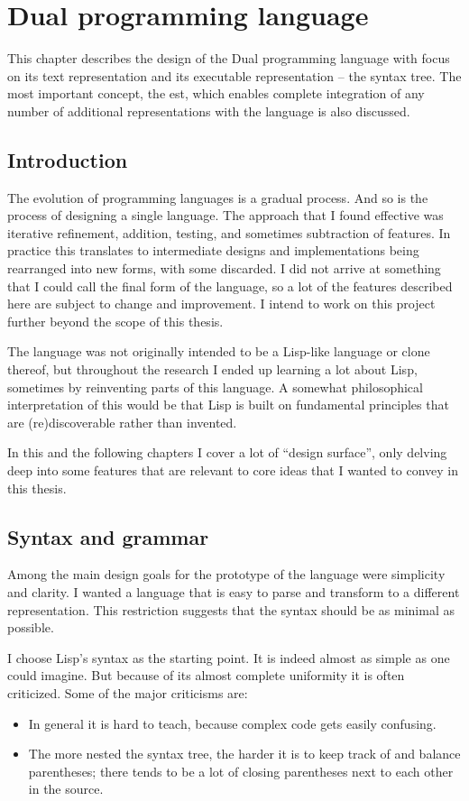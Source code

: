 \chapter{Dual programming language}\label{chap:lang}
This chapter describes the design of the Dual programming language with focus on its text representation and its executable representation -- the syntax tree. The most important concept, the \acrlong{est}, which enables complete integration of any number of additional representations with the language is also discussed.

\section{Introduction}
The evolution of programming languages is a gradual process. And so is the process of designing a single language. The approach that I found effective was iterative refinement, addition, testing, and sometimes subtraction of features. In practice this translates to intermediate designs and implementations being rearranged into new forms, with some discarded. I did not arrive at something that I could call the final form of the language, so a lot of the features described here are subject to change and improvement. I intend to work on this project further beyond the scope of this thesis.

The language was not originally intended to be a Lisp-like language or clone thereof, but throughout the research I ended up learning a lot about Lisp, sometimes by reinventing parts of this language. A somewhat philosophical interpretation of this would be that Lisp is built on fundamental principles that are (re)discoverable rather than invented.

In this and the following chapters I cover a lot of ``design surface'', only delving deep into some features that are relevant to core ideas that I wanted to convey in this thesis.

\section{Syntax and grammar}
Among the main design goals for the prototype of the language were simplicity
and clarity. I wanted a language that is easy to parse and transform to a
different representation. This restriction suggests that the syntax should be as
minimal as possible.  

I choose Lisp's syntax as the starting point. It is indeed almost as simple as one could imagine. But because of its almost complete uniformity it is often criticized. Some of the major criticisms are:
\begin{itemize}
    \item In general it is hard to teach, because complex code gets easily confusing\cite{wadler_critique}.
    \item The more nested the syntax tree, the harder it is to keep track of and
      balance parentheses; there tends to be a lot of closing parentheses next
      to each other in the source\cite{c2_parentheses}.
\end{itemize}

